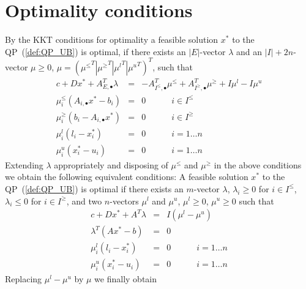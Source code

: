 \documentclass[a4paper]{article}
\begin{document}
\section{Optimality conditions}
By the KKT conditions for optimality a feasible solution $x^{*}$ to the
QP~(\ref{def:QP_UB}) is optimal, if there exists an $\left|E\right|$-vector
$\lambda$ and an $\left|I\right|+2n$-vector $\mu \geq 0$,
$\mu=\left({\mu^{\leq}}^{T}\left|\right. {\mu^{\geq}}^{T} \left|\right.
{\mu^{l}}^{T} \left|\right. {\mu^{u}}^{T}\right)^{T}$, such that
\begin{eqnarray*}
c + Dx^{*} +A_{E, \bullet}^{T}\lambda
&=&
-A_{I^{\leq}, \bullet}^{T}\mu^{\leq} + A_{I^{\geq}, \bullet}^{T}\mu^{\geq}
+I\mu^{l} -I\mu^{u}  \\
\mu_{i}^{\leq}\left(A_{i, \bullet}x^{*}-b_{i}\right)
&=&
0 \quad\quad\quad i \in I^{\leq}\\
\mu_{i}^{\geq}\left(b_{i}-A_{i, \bullet}x^{*}\right)
&=&
0 \quad\quad\quad i \in I^{\geq}\\
\mu_{i}^{l}\left(l_{i}-x_{i}^{*}\right)
&=& 
0 \quad\quad\quad i= 1 \dots n\\
\mu_{i}^{u}\left(x_{i}^{*}-u_{i}\right)
&=&
0 \quad\quad\quad i=1 \dots n
\end{eqnarray*}
Extending $\lambda$ appropriately and disposing of $\mu^{\leq}$ and $\mu^{\geq}$ in the above conditions we obtain
the following equivalent conditions:
A feasible solution $x^{*}$ to the QP~(\ref{def:QP_UB}) is optimal if there exists an $m$-vector $\lambda$, $\lambda_{i} \geq 0$ for $i \in I^{\leq}$,
$\lambda_{i} \leq 0$ for $i \in I^{\geq}$, and two $n$-vectors $\mu^{l}$ and
$\mu^{u}$, $\mu^{l} \geq 0$, $\mu^{u} \geq 0$ such that
\begin{eqnarray*}
c + Dx^{*} +A^{T}\lambda
&=&
I\left(\mu^{l} -\mu^{u}\right)  \\
\lambda^{T}\left(Ax^{*}-b\right)
&=&
0 \\
\mu_{i}^{l}\left(l_{i}-x_{i}^{*}\right)
&=& 
0 \quad\quad\quad i= 1 \dots n\\
\mu_{i}^{u}\left(x_{i}^{*}-u_{i}\right)
&=&
0 \quad\quad\quad i=1 \dots n
\end{eqnarray*}
Replacing $\mu^{l}-\mu^{u}$ by $\mu$ we finally obtain
\end{document}
